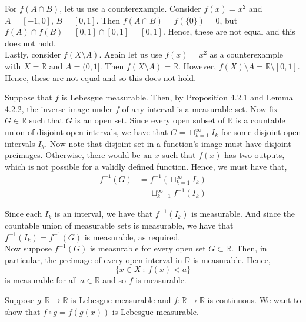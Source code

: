 \documentclass[12pt]{article}
\newenvironment{problem}[2][Problem]{\begin{trivlist}
\item[\hskip \labelsep {\bfseries #1}\hskip \labelsep {\bfseries #2.}]}{\end{trivlist}}
\begin{document}
For $f(A \cap B)$, let us use a counterexample. Consider $f(x) = x^2$ and $A = [-1, 0]$, $B = [0,1]$. Then $f(A \cap B) = f(\{0\}) = 0$, but $f(A) \cap f(B) = [0, 1] \cap [0,1] = [0, 1]$. Hence, these are not equal and this does not hold.\\

Lastly, consider $f(X \setminus A)$. Again let us use $f(x) = x^2$ as a counterexample with $X = \mathbb{R}$ and $A = (0,1]$. Then $f(X \setminus A) = \mathbb{R}$. However, $f(X) \setminus A = \mathbb{R} \setminus [0, 1]$. Hence, these are not equal and so this does not hold.

\begin{problem}{6}
\end{problem}

Suppose that $f$ is Lebesgue measurable. Then, by Proposition 4.2.1 and Lemma 4.2.2, the inverse image under $f$ of any interval is a measurable set. Now fix $G \in \mathbb{R}$ such that $G$ is an open set. Since every open subset of $\mathbb{R}$ is a countable union of disjoint open intervals, we have that $G = \sqcup_{k=1}^{\infty} I_k$ for some disjoint open intervals $I_k$. Now note that disjoint set in a function's image must have disjoint preimages. Otherwise, there would be an $x$ such that $f(x)$ has two outputs, which is not possible for a validly defined function. Hence, we must have that,
\begin{align*}
f^{-1}(G) &= f^{-1}\left(\sqcup_{k=1}^{\infty} I_k \right)\\
&= \sqcup_{k=1}^{\infty} f^{-1}(I_k)
\end{align*}

Since each $I_k$ is an interval, we have that $f^{-1}(I_k)$ is measurable. And since the countable union of measurable sets is measurable, we have that $f^{-1}(I_k) = f^{-1}(G)$ is measurable, as required.\\

Now suppose $f^{-1}(G)$ is measurable for every open set $G \subset \mathbb{R}$. Then, in particular, the preimage of every open interval in $\mathbb{R}$ is measurable. Hence, $$\{x \in X \ : \ f(x) < a\}$$ is measurable for all $a \in \mathbb{R}$ and so $f$ is measurable.

\begin{problem}{7}
\end{problem}

Suppose $g: \mathbb{R} \to \mathbb{R}$ is Lebesgue measurable and $f: \mathbb{R} \to \mathbb{R}$ is continuous. We want to show that $f \circ g = f(g(x))$ is Lebesgue measurable.\\
\end{document}
